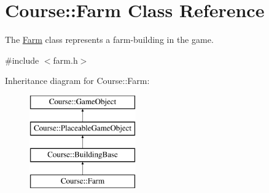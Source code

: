 \hypertarget{classCourse_1_1Farm}{\section{Course\-:\-:Farm Class Reference}
\label{classCourse_1_1Farm}
}


The \hyperlink{classCourse_1_1Farm}{Farm} class represents a farm-\/building in the game.  




{\ttfamily \#include $<$farm.\-h$>$}

Inheritance diagram for Course\-:\-:Farm\-:\begin{figure}[H]
\begin{center}
\leavevmode
\includegraphics[height=4.000000cm]{classCourse_1_1Farm}
\end{center}
\end{figure}
